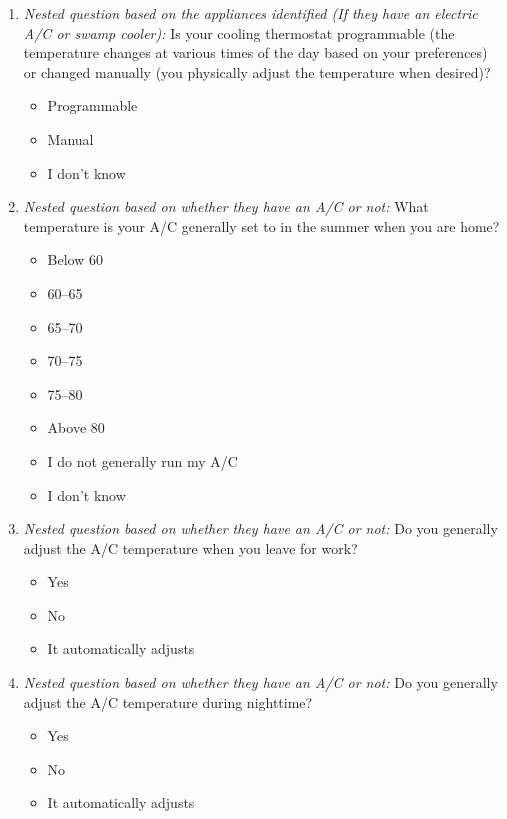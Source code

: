 \documentclass{article}
\begin{document}
\begin{enumerate}
\item \textit{Nested question based on the appliances identified (If they have an electric A/C or swamp cooler):}
Is your cooling thermostat programmable (the temperature changes at various times of the day based on your preferences) or changed manually (you physically adjust the temperature when desired)?
\begin{itemize}
  \item[\checkbox] Programmable
  \item[\checkbox] Manual
  \item[\checkbox] I don't know
\end{itemize}
 

\item \textit{Nested question based on whether they have an A/C or not:}
What temperature is your A/C generally set to in the summer when you are home?
\begin{itemize}
  \item[\checkbox] Below 60
  \item[\checkbox] 60--65
  \item[\checkbox] 65--70
  \item[\checkbox] 70--75
  \item[\checkbox] 75--80
  \item[\checkbox] Above 80
  \item[\checkbox] I do not generally run my A/C
  \item[\checkbox] I don't know
\end{itemize}
 

\item \textit{Nested question based on whether they have an A/C or not:}
Do you generally adjust the A/C temperature when you leave for work?
\begin{itemize}
  \item[\checkbox] Yes
  \item[\checkbox] No
  \item[\checkbox] It automatically adjusts
\end{itemize}
 

\item \textit{Nested question based on whether they have an A/C or not:}
Do you generally adjust the A/C temperature during nighttime?
\begin{itemize}
  \item[\checkbox] Yes
  \item[\checkbox] No
  \item[\checkbox] It automatically adjusts
\end{itemize}
 


\end{enumerate}
\end{document}
